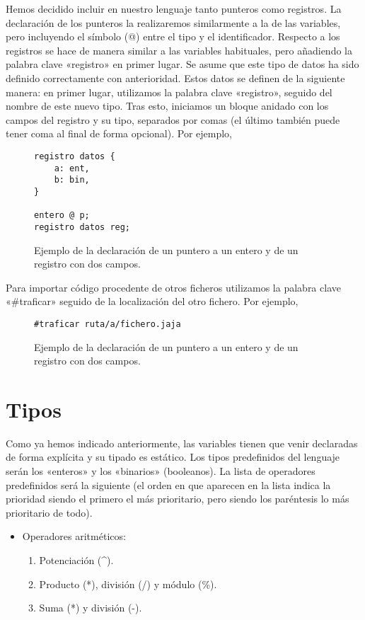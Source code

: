 Hemos decidido incluir en nuestro lenguaje tanto punteros como registros. La
declaración de los punteros la realizaremos similarmente a la de las variables,
pero incluyendo el símbolo (@) entre el tipo y el identificador. Respecto a los
registros se hace de manera similar a las variables habituales, pero añadiendo
la palabra clave «registro» en primer lugar. Se asume que este tipo de datos ha
sido definido correctamente con anterioridad. Estos datos se definen de la
siguiente manera: en primer lugar, utilizamos la palabra clave «registro»,
seguido del nombre de este nuevo tipo. Tras esto, iniciamos un bloque anidado
con los campos del registro y su tipo, separados por comas (el último también
puede tener coma al final de forma opcional). Por ejemplo,
\begin{figure}[H]
    \centering
    \begin{lstlisting}
registro datos {
    a: ent,
    b: bin,
}

entero @ p;
registro datos reg;
    \end{lstlisting}
    \caption{Ejemplo de la declaración de un puntero a un entero y de un
    registro con dos campos.}
\end{figure}

Para importar código procedente de otros ficheros utilizamos la palabra clave
«\#traficar» seguido de la localización del otro fichero. Por ejemplo,
\begin{figure}[H]
    \centering
    \begin{lstlisting}
#traficar ruta/a/fichero.jaja
    \end{lstlisting}
    \caption{Ejemplo de la declaración de un puntero a un entero y de un
    registro con dos campos.}
\end{figure}

\section*{Tipos}
Como ya hemos indicado anteriormente, las variables tienen que venir declaradas
de forma explícita y su tipado es estático. Los tipos predefinidos del lenguaje
serán los «enteros» y los «binarios» (booleanos). La lista de operadores
predefinidos será la siguiente (el orden en que aparecen en la lista indica la
prioridad siendo el primero el más prioritario, pero siendo los paréntesis lo
más prioritario de todo).
\begin{itemize}
\item Operadores aritméticos:
    \begin{enumerate}
        \item Potenciación (\^{}).
        \item Producto (*), división (/) y módulo (\%).
        \item Suma (*) y división (-).
    \end{enumerate}
\end{itemize}
